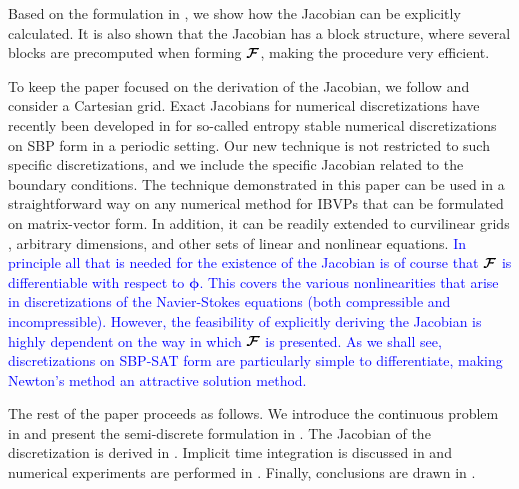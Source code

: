 Based on the formulation in \cite{nordstrom2019energy}, we show how the Jacobian can be explicitly calculated. It is also shown that the Jacobian has a block structure, where several blocks are precomputed when forming $\bm{\mathcal{F}}$, making the procedure very efficient. 

To keep the paper focused on the derivation of the Jacobian, we follow \cite{nordstrom2019energy} and consider a Cartesian grid. Exact Jacobians for numerical discretizations have recently been developed in \cite{chan2020explicit} for so-called entropy stable numerical discretizations on SBP form in a periodic setting. Our new technique is not restricted to such specific discretizations, and we include the specific Jacobian related to the boundary conditions. The technique demonstrated in this paper can be used in a straightforward way on any numerical method for IBVPs that can be formulated on matrix-vector form.  In addition, it can be readily extended to curvilinear grids \cite{aalund2019encapsulated}, arbitrary dimensions, and other sets of linear and nonlinear equations. \textcolor{blue}{In principle all that is needed for the existence of the Jacobian is of course that $\bm{\mathcal{F}}$ is differentiable with respect to $\bm{\phi}$. This covers the various nonlinearities that arise in discretizations of the Navier-Stokes equations (both compressible and incompressible). However, the feasibility of explicitly deriving the Jacobian is highly dependent on the way in which $\bm{\mathcal{F}}$ is presented. As we shall see, discretizations on SBP-SAT form are particularly simple to differentiate, making Newton's method an attractive solution method.}

The rest of the paper proceeds as follows. We introduce the continuous problem in  and present the semi-discrete formulation in . The Jacobian of the discretization is derived in . Implicit time integration is discussed in  and numerical experiments are performed in . Finally, conclusions are drawn in .
